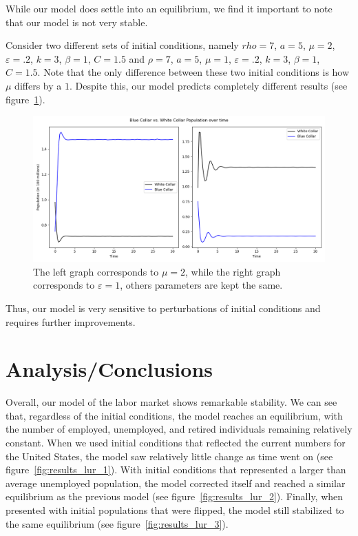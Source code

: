 \documentclass[11pt]{amsart}
\begin{document}

While our model does settle into an equilibrium, we find it important to note that our model is not very stable.

Consider two different sets of initial conditions, namely $rho = 7$, $a = 5$, $\mu = 2$, $\varepsilon = .2$, $k = 3$, $\beta = 1$, $C = 1.5$ and 
$\rho = 7$, $a = 5$, $\mu = 1$, $\varepsilon = .2$, $k = 3$, $\beta = 1$, $C = 1.5$. Note that the only difference between these two initial conditions is
how $\mu$ differs by a $1$. Despite this, our model predicts completely different results (see figure~\ref{fig:results_wb_3}).

\begin{figure}[h]
    \centering
    \includegraphics[width=.8\textwidth]{figures/bad_paramenters.png}
    \caption{The left graph corresponds to $\mu = 2$, while the right graph corresponds to $\varepsilon = 1$, others parameters are kept the same.}
    \label{fig:results_wb_3}
\end{figure}

Thus, our model is very sensitive to perturbations of initial conditions and requires further improvements.

\section{Analysis/Conclusions}

Overall, our model of the labor market shows remarkable stability. 
We can see that, regardless of the initial conditions, the model reaches an equilibrium, 
with the number of employed, unemployed, and retired individuals remaining relatively constant.
When we used initial conditions that reflected the current numbers for the United States,
the model saw relatively little change as time went on (see figure~\ref{fig:results_lur_1}).
With initial conditions that represented a larger than average unemployed population, the model corrected itself and reached a
similar equilibrium as the previous model (see figure~\ref{fig:results_lur_2}).
Finally, when presented with initial populations that were flipped, the model still stabilized to the same equilibrium
(see figure~\ref{fig:results_lur_3}).
\end{document}
